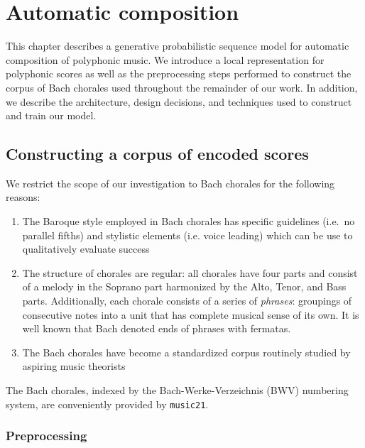 \chapter{Automatic composition}

\ifpdf
    \graphicspath{{Chapter4/Figs/Raster/}{Chapter4/Figs/PDF/}{Chapter4/Figs/}}
\else
    \graphicspath{{Chapter4/Figs/Vector/}{Chapter4/Figs/}}
\fi

This chapter describes a generative probabilistic sequence model for automatic
composition of polyphonic music. We introduce a local representation for
polyphonic scores as well as the preprocessing steps performed to construct
the corpus of Bach chorales used throughout the remainder of our work. In addition,
we describe the architecture, design decisions, and techniques used to construct
and train our model.

\section{Constructing a corpus of encoded scores}

We restrict the scope of our investigation to Bach chorales for the following reasons:
\begin{enumerate}
  \item The Baroque style employed in Bach chorales has specific guidelines
    \citep{piston1978harmony} (i.e.\ no parallel fifths) and stylistic elements
    (i.e. voice leading) which can be use to qualitatively evaluate success
  \item The structure of chorales are regular: all chorales have four parts and
    consist of a melody in the Soprano part harmonized by the Alto, Tenor, and
    Bass parts. Additionally, each chorale consists of a series of \emph{phrases}:
    groupings of consecutive notes into a unit that has complete musical sense
    of its own\citep{nattiez1990music}. It is well known that Bach
    denoted ends of phrases with fermatas.
  \item The Bach chorales have become a standardized corpus routinely studied
    by aspiring music theorists\citep{white2002guidelines}
\end{enumerate}
The Bach chorales, indexed by the Bach-Werke-Verzeichnis (BWV) numbering
system\citep{butt1999bach}, are conveniently provided by
\texttt{music21}\citep{Scott2015}.

\subsection{Preprocessing}

